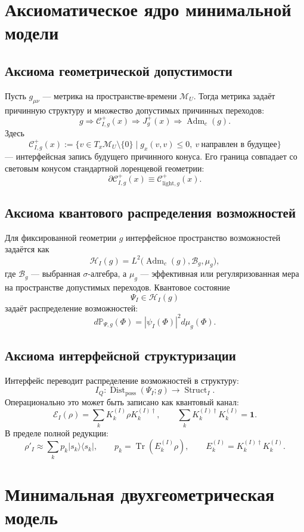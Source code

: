 \documentclass[12pt,a4paper]{article}
\DeclareMathOperator{\Adm}{Adm}
\DeclareMathOperator{\Struct}{Struct}
\DeclareMathOperator{\Dist}{Dist}
\DeclareMathOperator{\Tr}{Tr}
\newcommand{\M}{\mathcal M_U}
\newcommand{\Hilb}{\mathcal H}
\newcommand{\Prob}{\mathbb P}
\begin{document}
\section{Аксиоматическое ядро минимальной модели}

\subsection{Аксиома геометрической допустимости}

Пусть \(g_{\mu\nu}\) --- метрика на пространстве-времени \(\M\). Тогда метрика задаёт причинную структуру и множество допустимых причинных переходов:
\[
g
\Rightarrow
\mathcal C^+_{I,g}(x)
\Rightarrow
J_g^+(x)
\Rightarrow
\Adm_c(g).
\]
Здесь
\[
\mathcal C^{+}_{I,g}(x)
:=
\{v\in T_x\M\setminus\{0\}\mid g_x(v,v)\leq 0,\ v\ \text{направлен в будущее}\}
\]
--- интерфейсная запись будущего причинного конуса. Его граница совпадает со световым конусом стандартной лоренцевой геометрии:
\[
\partial\mathcal C^{+}_{I,g}(x)
\equiv
\mathcal C^{+}_{\mathrm{light},g}(x).
\]

\subsection{Аксиома квантового распределения возможностей}

Для фиксированной геометрии \(g\) интерфейсное пространство возможностей задаётся как
\[
\Hilb_I(g)=L^2\bigl(\Adm_c(g),\mathcal B_g,\mu_g\bigr),
\]
где \(\mathcal B_g\) --- выбранная \(\sigma\)-алгебра, а \(\mu_g\) --- эффективная или регуляризованная мера на пространстве допустимых переходов. Квантовое состояние
\[
\Psi_I\in \Hilb_I(g)
\]
задаёт распределение возможностей:
\[
d\Prob_{\Psi,g}(\Phi)=|\psi_I(\Phi)|^2d\mu_g(\Phi).
\]

\subsection{Аксиома интерфейсной структуризации}

Интерфейс переводит распределение возможностей в структуру:
\[
I_Q:
\Dist_{\mathrm{poss}}(\Psi_I;g)
\longrightarrow
\Struct_I.
\]
Операционально это может быть записано как квантовый канал:
\[
\mathcal E_I(\rho)=\sum_k K_k^{(I)}\rho K_k^{(I)\dagger},
\qquad
\sum_k K_k^{(I)\dagger}K_k^{(I)}=\mathbf 1.
\]
В пределе полной редукции:
\[
\rho'_I\approx \sum_k p_k |s_k\rangle\langle s_k|,
\qquad
p_k=\Tr(E_k^{(I)}\rho),
\qquad
E_k^{(I)}=K_k^{(I)\dagger}K_k^{(I)}.
\]

\section{Минимальная двухгеометрическая модель}
\end{document}
